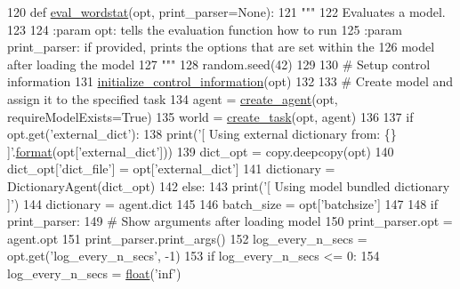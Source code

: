 \begin{DoxyCode}
120 \textcolor{keyword}{def }\hyperlink{namespaceprojects_1_1controllable__dialogue_1_1eval__wordstat_aa89fea1e83d255fa77e81e73a7d81161}{eval\_wordstat}(opt, print\_parser=None):
121     \textcolor{stringliteral}{"""}
122 \textcolor{stringliteral}{    Evaluates a model.}
123 \textcolor{stringliteral}{}
124 \textcolor{stringliteral}{    :param opt: tells the evaluation function how to run}
125 \textcolor{stringliteral}{    :param print\_parser: if provided, prints the options that are set within the}
126 \textcolor{stringliteral}{        model after loading the model}
127 \textcolor{stringliteral}{    """}
128     random.seed(42)
129 
130     \textcolor{comment}{# Setup control information}
131     \hyperlink{namespaceprojects_1_1controllable__dialogue_1_1controllable__seq2seq_1_1controls_aafbe257df1791349439cc63c99de8b5e}{initialize\_control\_information}(opt)
132 
133     \textcolor{comment}{# Create model and assign it to the specified task}
134     agent = \hyperlink{namespaceparlai_1_1core_1_1agents_ad0d54074d4bcc148bb415ab5515a53b5}{create\_agent}(opt, requireModelExists=\textcolor{keyword}{True})
135     world = \hyperlink{namespaceparlai_1_1core_1_1worlds_a11923c10b545c7ecc1b08fe2242d9c2c}{create\_task}(opt, agent)
136 
137     \textcolor{keywordflow}{if} opt.get(\textcolor{stringliteral}{'external\_dict'}):
138         print(\textcolor{stringliteral}{'[ Using external dictionary from: \{\} ]'}.\hyperlink{namespaceparlai_1_1chat__service_1_1services_1_1messenger_1_1shared__utils_a32e2e2022b824fbaf80c747160b52a76}{format}(opt[\textcolor{stringliteral}{'external\_dict'}]))
139         dict\_opt = copy.deepcopy(opt)
140         dict\_opt[\textcolor{stringliteral}{'dict\_file'}] = opt[\textcolor{stringliteral}{'external\_dict'}]
141         dictionary = DictionaryAgent(dict\_opt)
142     \textcolor{keywordflow}{else}:
143         print(\textcolor{stringliteral}{'[ Using model bundled dictionary ]'})
144         dictionary = agent.dict
145 
146     batch\_size = opt[\textcolor{stringliteral}{'batchsize'}]
147 
148     \textcolor{keywordflow}{if} print\_parser:
149         \textcolor{comment}{# Show arguments after loading model}
150         print\_parser.opt = agent.opt
151         print\_parser.print\_args()
152     log\_every\_n\_secs = opt.get(\textcolor{stringliteral}{'log\_every\_n\_secs'}, -1)
153     \textcolor{keywordflow}{if} log\_every\_n\_secs <= 0:
154         log\_every\_n\_secs = \hyperlink{namespaceprojects_1_1controllable__dialogue_1_1make__control__dataset_aa2b7207688c641dbc094ab44eca27113}{float}(\textcolor{stringliteral}{'inf'})

\end{DoxyCode}
